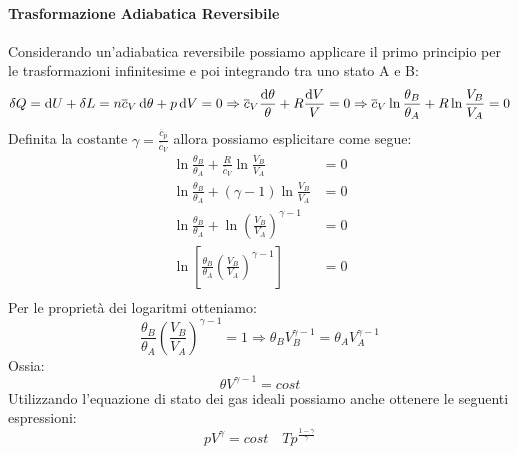 \documentclass{article}
\newcommand{\then}{\ensuremath{\Rightarrow}}
\begin{document}
\paragraph{Trasformazione Adiabatica Reversibile} Considerando un'adiabatica reversibile possiamo applicare il primo principio per le trasformazioni infinitesime e poi integrando tra uno stato A e B:
\[\delta Q=\dif U+\delta L=n\overline{c}_V\dif\theta+p\dif V=0\then \overline{c}_V\frac{\dif\theta}{\theta}+R\frac{\dif V}{V}=0\then \overline{c}_V\ln\frac{\theta_B}{\theta_A}+R\ln\frac{V_B}{V_A}=0\]
Definita la costante $\gamma=\frac{\overline{c}_p}{\overline{c}_V}$ allora possiamo esplicitare come segue:
\begin{equation}
\begin{split}
    \ln\frac{\theta_B}{\theta_A}+\frac{R}{\overline{c}_V}\ln\frac{V_B}{V_A}&=0\\
    \ln\frac{\theta_B}{\theta_A}+(\gamma-1)\ln\frac{V_B}{V_A}&=0\\
    \ln\frac{\theta_B}{\theta_A}+\ln\left(\frac{V_B}{V_A}\right)^{\gamma-1}&=0\\
    \ln\left[\frac{\theta_B}{\theta_A}\left(\frac{V_B}{V_A}\right)^{\gamma-1}\right]&=0\\
\end{split}
\end{equation}
Per le proprietà dei logaritmi otteniamo:
\[\frac{\theta_B}{\theta_A}\left(\frac{V_B}{V_A}\right)^{\gamma-1}=1\then \theta_BV_B^{\gamma-1}=\theta_AV_A^{\gamma-1}\]
Ossia:
\begin{equation}
\boxed{\theta V^{\gamma-1}=cost}
\end{equation}
Utilizzando l'equazione di stato dei gas ideali possiamo anche ottenere le seguenti espressioni:
\[pV^{\gamma}=cost\quad Tp^{\frac{1-\gamma}{\gamma}}\]
\end{document}

